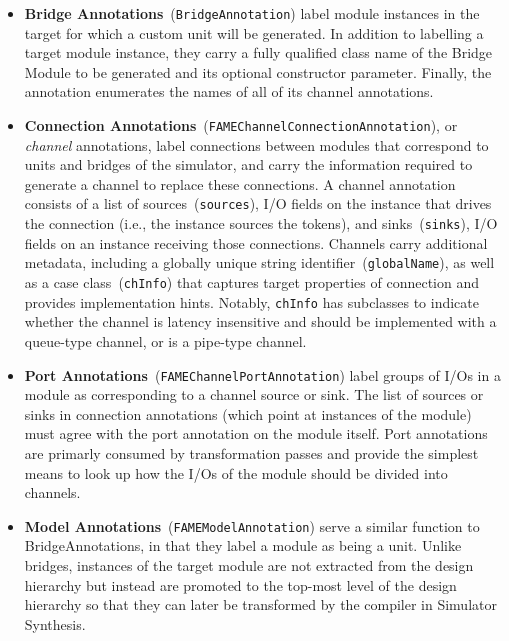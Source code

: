 \begin{itemize}
    \item \textbf{Bridge Annotations}~(\texttt{BridgeAnnotation}) label module
        instances in the target for which a custom unit will be generated.  In
        addition to labelling a target module instance, they carry a fully qualified
        class name of the Bridge Module to be generated and its optional
        constructor parameter. Finally, the annotation enumerates the names of all
        of its channel annotations.

\item \textbf{Connection
    Annotations}~(\texttt{FAMEChannelConnectionAnnotation}), or \emph{channel}
    annotations, label connections between modules that correspond to units
    and bridges of the simulator, and carry the information required to
    generate a channel to replace these connections. A channel annotation consists of
    a list of sources~(\texttt{sources}), I/O fields on the instance that drives the connection
    (i.e., the instance sources the tokens), and sinks~(\texttt{sinks}), I/O fields on an instance
    receiving those connections. Channels carry additional metadata,
    including a globally unique string identifier~(\texttt{globalName}), as well as a case class~(\texttt{chInfo}) that
    captures target properties of connection and provides implementation hints.
    Notably, \texttt{chInfo} has subclasses to indicate whether the channel is latency
    insensitive and should be implemented with a queue-type channel, or is a pipe-type channel.

\item \textbf{Port Annotations}~(\texttt{FAMEChannelPortAnnotation}) label
    groups of I/Os in a module as corresponding to a channel source or sink.
    The list of sources or sinks in connection annotations (which point
    at instances of the module) must agree with the port annotation on the
    module itself. Port annotations are primarly consumed by transformation passes and provide the simplest means
    to look up how the I/Os of the module should be divided into channels.

\item \textbf{Model Annotations}~(\texttt{FAMEModelAnnotation}) serve a similar function to BridgeAnnotations, in that they label a
    module as being a unit. Unlike bridges, instances of the target module
    are not extracted from the design hierarchy but instead are promoted to
    the top-most level of the design hierarchy so that they can later be
    transformed by the compiler in Simulator Synthesis.
\end{itemize}

